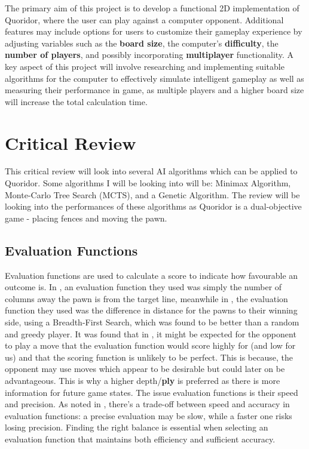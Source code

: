 \documentclass[review]{cmpreport}
\begin{document}
\noindent The primary aim of this project is to develop a functional 2D implementation of Quoridor, where the user can play against a computer opponent. Additional features may include options for users to customize their gameplay experience by adjusting variables such as the \textbf{board size}, the computer's \textbf{difficulty}, the \textbf{number of players}, and possibly incorporating \textbf{multiplayer} functionality. A key aspect of this project will involve researching and implementing suitable algorithms for the computer to effectively simulate intelligent gameplay as well as measuring their performance in game, as multiple players and a higher board size will increase the total calculation time.

\section{Critical Review}
This critical review will look into several AI algorithms which can be applied to Quoridor. Some algorithms I will be looking into will be: Minimax Algorithm, Monte-Carlo Tree Search (MCTS), and a Genetic Algorithm. The review will be looking into the performances of these algorithms as Quoridor is a dual-objective game - placing fences and moving the pawn.

\subsection{Evaluation Functions}
Evaluation functions are used to calculate a score to indicate how favourable an outcome is. In \cite{mertens2006quoridor}, an evaluation function they used was simply the number of columns away the pawn is from the target line, meanwhile in \cite{josequoridor}, the evaluation function they used was the difference in distance for the pawns to their winning side, using a Breadth-First Search, which was found to be better than a random and greedy player. It was found that in \cite{strong2011minimax}, it might be expected for the opponent to play a move that the evaluation function would score highly for (and low for us) and that the scoring function is unlikely to be perfect. This is because, the opponent may use moves which appear to be desirable but could later on be advantageous. This is why a higher depth/\textbf{ply} is preferred as there is more information for future game states. The issue evaluation functions is their speed and precision. As noted in \cite{brenner2015artificial}, there’s a trade-off between speed and accuracy in evaluation functions: a precise evaluation may be slow, while a faster one risks losing precision. Finding the right balance is essential when selecting an evaluation function that maintains both efficiency and sufficient accuracy.
\end{document}
